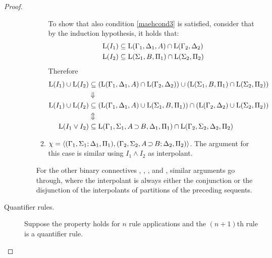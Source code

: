 \begin{proof}
\begin{description}
\begin{itemize}
\begin{enumerate}
							{


								To show that also condition \ref{maehcond3} is satisfied, consider that by the induction hypothesis, it holds that:
								\begin{align*}
									\operatorname{L}(I_1) &\subseteq \operatorname{L}(\Gamma_1, \Delta_1, A) \cap \operatorname{L}(\Gamma_2, \Delta_2) \\
									\operatorname{L}(I_2) &\subseteq \operatorname{L}(\Sigma_1, B, \Pi_1) \cap \operatorname{L}(\Sigma_2, \Pi_2)
								\end{align*}\nopagebreak
								Therefore
								\begin{align*}
									\operatorname{L}(I_1) \cup \operatorname{L}(I_2) &\subseteq
									(\operatorname{L}(\Gamma_1, \Delta_1, A) \cap \operatorname{L}(\Gamma_2, \Delta_2)) \cup ( \operatorname{L}(\Sigma_1, B, \Pi_1) \cap \operatorname{L}(\Sigma_2, \Pi_2))  \\
									&\Downarrow \\
									\operatorname{L}(I_1) \cup \operatorname{L}(I_2) &\subseteq
									(\operatorname{L}(\Gamma_1, \Delta_1, A) \cup \operatorname{L}(\Sigma_1, B, \Pi_1)) \cap (\operatorname{L}(\Gamma_2, \Delta_2) \cup \operatorname{L}(\Sigma_2, \Pi_2)) \\
									&\Updownarrow \\
									\operatorname{L}(I_1 \lor I_2) &\subseteq \operatorname{L}(\Gamma_1, \Sigma_1, A\operatorname{\supset} B, \Delta_1, \Pi_1) \cap \operatorname{L}(\Gamma_2, \Sigma_2, \Delta_2, \Pi_2)
								\end{align*}

							}

						\item $\chi =  \langle (\Gamma_1, \Sigma_1; \Delta_1, \Pi_1), (\Gamma_2, \Sigma_2, A\operatorname{\supset} B; \Delta_2, \Pi_2)\rangle $.
							The argument for this case is similar using $I_1 \land I_2$ as interpolant.
					\end{enumerate}


					For the other binary connectives , , ,  and , similar arguments go through, where the interpolant is always either the conjunction or the disjunction of the interpolants of partitions of the preceding sequents.

			\end{itemize}

		\item[\normalfont Quantifier rules.]
			Suppose the property holds for $n$ rule applications and the $(n+1)$th rule is a quantifier rule.


\end{description}
\end{proof}
